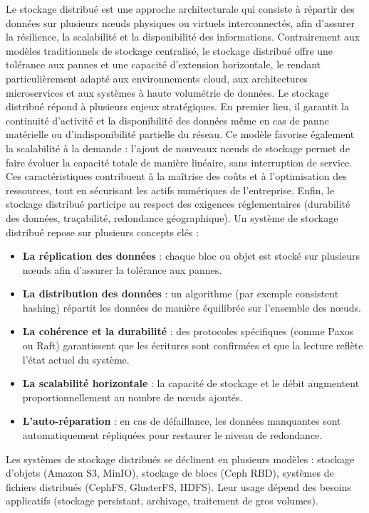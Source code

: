 Le stockage distribué est une approche architecturale qui consiste à répartir des données sur plusieurs nœuds physiques ou virtuels interconnectés, afin d’assurer la résilience, la scalabilité et la disponibilité des informations. Contrairement aux modèles traditionnels de stockage centralisé, le stockage distribué offre une tolérance aux pannes et une capacité d’extension horizontale, le rendant particulièrement adapté aux environnements cloud, aux architectures microservices et aux systèmes à haute volumétrie de données.
Le stockage distribué répond à plusieurs enjeux stratégiques. En premier lieu, il garantit la continuité d’activité et la disponibilité des données même en cas de panne matérielle ou d’indisponibilité partielle du réseau. Ce modèle favorise également la scalabilité à la demande  : l’ajout de nouveaux nœuds de stockage permet de faire évoluer la capacité totale de manière linéaire, sans interruption de service. Ces caractéristiques contribuent à la maîtrise des coûts et à l’optimisation des ressources, tout en sécurisant les actifs numériques de l’entreprise. Enfin, le stockage distribué participe au respect des exigences réglementaires (durabilité des données, traçabilité, redondance géographique).
Un système de stockage distribué repose sur plusieurs concepts clés :
\begin{itemize}
	\item \textbf{La réplication des données}  : chaque bloc ou objet est stocké sur plusieurs nœuds afin d’assurer la tolérance aux pannes.
	\item \textbf{La distribution des données}  : un algorithme (par exemple consistent hashing) répartit les données de manière équilibrée sur l’ensemble des nœuds.
	\item \textbf{La cohérence et la durabilité}  : des protocoles spécifiques (comme Paxos ou Raft) garantissent que les écritures sont confirmées et que la lecture reflète l’état actuel du système.
	\item \textbf{La scalabilité horizontale}  : la capacité de stockage et le débit augmentent proportionnellement au nombre de nœuds ajoutés.
	\item \textbf{L’auto-réparation}  : en cas de défaillance, les données manquantes sont automatiquement répliquées pour restaurer le niveau de redondance.
\end{itemize}

Les systèmes de stockage distribués se déclinent en plusieurs modèles  : stockage d’objets (Amazon S3, MinIO), stockage de blocs (Ceph RBD), systèmes de fichiers distribués (CephFS, GlusterFS, HDFS). Leur usage dépend des besoins applicatifs (stockage persistant, archivage, traitement de gros volumes).

